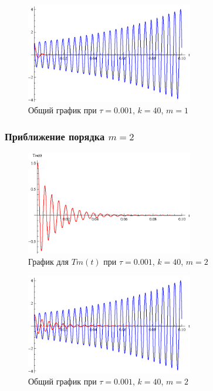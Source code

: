 \begin{figure}[h]
\begin{center}
\includegraphics[width=0.65\textwidth]{./3_results/4_3.eps}
\end{center}
\caption{Общий график при $\tau=0.001$, $k=40$, $m=1$}
\end{figure}

\newpage

\subsubsection{Приближение порядка $m=2$}

\begin{figure}[h]
\begin{center}
\includegraphics[width=0.65\textwidth]{./3_results/4_4.eps}
\end{center}
\caption{График для $Tm(t)$ при $\tau=0.001$, $k=40$, $m=2$}
\end{figure}

\begin{figure}[h]
\begin{center}
\includegraphics[width=0.65\textwidth]{./3_results/4_5.eps}
\end{center}
\caption{Общий график при $\tau=0.001$, $k=40$, $m=2$}
\end{figure}

